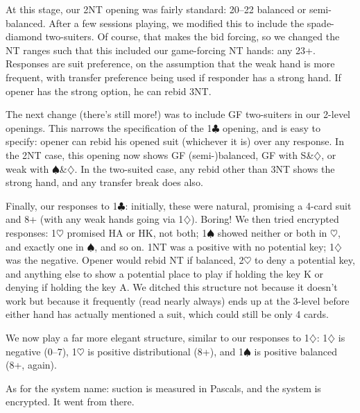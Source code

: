 \documentclass[a4paper,14pt]{extarticle}
\begin{document}
At this stage, our 2NT opening was fairly standard: 20--22 balanced or
semi-balanced.  After a few sessions playing, we modified this to include the
spade-diamond two-suiters.  Of course, that makes the bid forcing, so we
changed the NT ranges such that this included our game-forcing NT hands: any
23+.  Responses are suit preference, on the assumption that the weak hand is
more frequent, with transfer preference being used if responder has a strong
hand.  If opener has the strong option, he can rebid 3NT.

The next change (there's still more!) was to include GF two-suiters in our
2-level openings.  This narrows the specification of the 1$\clubsuit$ opening, and is
easy to specify: opener can rebid his opened suit (whichever it is) over any
response.  In the 2NT case, this opening now shows GF (semi-)balanced, GF with
S\&$\diamondsuit$, or weak with $\spadesuit$\&$\diamondsuit$.  In the two-suited case, any rebid other than 3NT shows
the strong hand, and any transfer break does also.

Finally, our responses to 1$\clubsuit$: initially, these were natural, promising a 4-card
suit and 8+ (with any weak hands going via 1$\diamondsuit$).  Boring!  We then tried
encrypted responses: 1$\heartsuit$ promised HA or HK, not both; 1$\spadesuit$ showed neither or both
in $\heartsuit$, and exactly one in $\spadesuit$, and so on.  1NT was a positive with no potential
key; 1$\diamondsuit$ was the negative.  Opener would rebid NT if balanced, 2$\heartsuit$ to deny a
potential key, and anything else to show a potential place to play if holding
the key K or denying if holding the key A.  We ditched this structure not
because it doesn't work but because it frequently (read nearly always) ends up
at the 3-level before either hand has actually mentioned a suit, which could
still be only 4 cards.

We now play a far more elegant structure, similar to our responses to 1$\diamondsuit$: 1$\diamondsuit$ is
negative (0--7), 1$\heartsuit$ is positive distributional (8+), and 1$\spadesuit$ is positive balanced
(8+, again).

As for the system name: suction is measured in Pascals, and the system is
encrypted.  It went from there.
\end{document}
